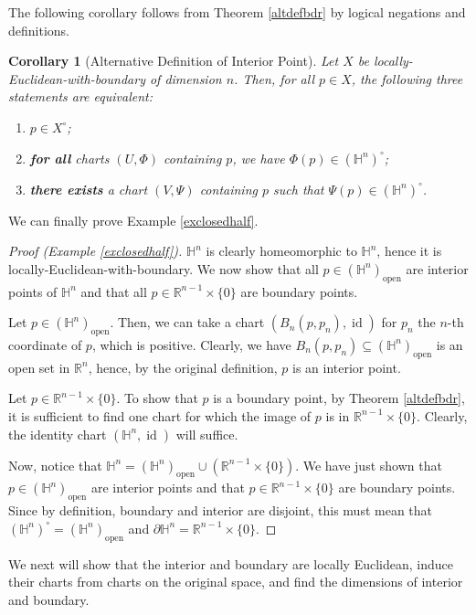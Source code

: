 \documentclass{article}
\newcommand{\R}{\mathbb{R}}
\renewcommand{\H}{\mathbb{H}}
\newcommand{\bdr}{\partial}
\newcommand{\id}{\operatorname{id}}
\theoremstyle{plain} %
\numberwithin{thm}{section} %
\newtheorem{cor}[thm]{Corollary}
\theoremstyle{definition} %
\begin{document}
The following corollary follows from Theorem \ref{altdefbdr} by logical negations and definitions.

\begin{cor}[Alternative Definition of Interior Point]
    \label{altdefint}
    Let $X$ be locally-Euclidean-with-boundary of dimension $n$. Then, for all $p \in X$, the following three statements are equivalent:
    \begin{enumerate}[label=\rm(\roman*)]
        \item $p \in X^{\circ}$;
        \item \textbf{for all} charts $(U, \Phi)$ containing $p$, we have $\Phi(p) \in (\H^n)^\circ$;
        \item \textbf{there exists} a chart $(V, \Psi)$ containing $p$ such that $\Psi(p) \in (\H^n)^\circ$.
    \end{enumerate}

\end{cor}

We can finally prove Example \ref{exclosedhalf}.

\begin{proof}[Proof (Example \ref{exclosedhalf})]
$\H^n$ is clearly homeomorphic to $\H^n$, hence it is locally-Euclidean-with-boundary. We now show that all $p \in (\H^n)_\mathrm{open}$ are interior points of $\H^n$ and that all $p \in \R^{n - 1} \times \{0\}$ are boundary points.

Let $p \in (\H^n)_\mathrm{open}$. Then, we can take a chart $(B_n(p, p_n), \id)$ for $p_n$ the $n$-th coordinate of $p$, which is positive. Clearly, we have $B_n(p, p_n) \subseteq (\H^n)_\mathrm{open}$ is an open set in $\R^n$, hence, by the original definition, $p$ is an interior point.

Let $p \in \R^{n - 1} \times \{0\}$. To show that $p$ is a boundary point, by Theorem \ref{altdefbdr}, it is sufficient to find one chart for which the image of $p$ is in $\R^{n - 1} \times \{0\}$. Clearly, the identity chart $(\H^n, \id)$ will suffice.

Now, notice that $\H^n = (\H^n)_\mathrm{open} \cup (\R^{n - 1} \times \{0\})$. We have just shown that $p \in (\H^n)_\mathrm{open}$ are interior points and that $p \in \R^{n - 1} \times \{0\}$ are boundary points. Since by definition, boundary and interior are disjoint, this must mean that $(\H^n)^\circ = (\H^n)_\mathrm{open}$ and $\bdr\H^n = \R^{n - 1} \times \{0\}$.
\end{proof}

We next will show that the interior and boundary are locally Euclidean, induce their charts from charts on the original space, and find the dimensions of interior and boundary.
\end{document}
